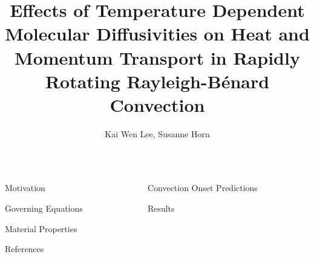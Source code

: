 \documentclass[mathserif]{beamer}
\title{Effects of Temperature Dependent Molecular Diffusivities on Heat and Momentum Transport in Rapidly Rotating Rayleigh-B\'enard Convection}
\author{Kai Wen Lee, Susanne Horn}
\institute{Centre for Fluids and Complex Systems, Coventry University}
\begin{document}
\begin{frame}[t]{}
	\begin{columns}[T]
        \begin{column}{0.367\textwidth}
            \begin{block}{Motivation}
	    \justifying
	    
            \end{block}
            
            \begin{block}{Governing Equations}
	    \justifying
	    
            \end{block}

            \begin{block}{Material Properties}
	    \justifying
		    
            \end{block}

	    \begin{block}{References}
	    \begingroup
		    \setlength{\parindent}{0pt} %
		    \setlength{\parskip}{0pt}   %
		    \printbibliography[heading=none]
	    \endgroup
	    \end{block}
        \end{column}

        \begin{column}{0.633\textwidth}

            \begin{block}{Convection Onset Predictions}
	    \justifying
		    
            \end{block}

            \begin{block}{Results}
	    \justifying
		    
            \end{block}

        \end{column}
    \end{columns}
\end{frame}
\end{document}
